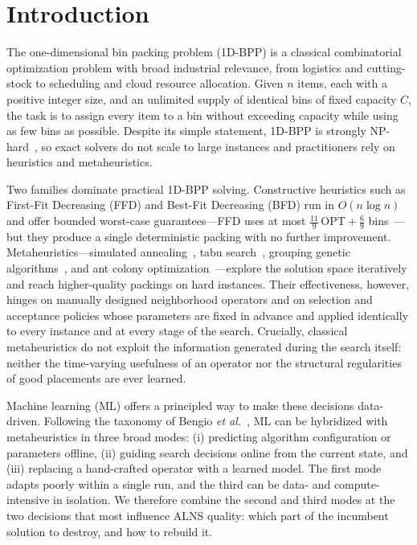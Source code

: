 \documentclass[conference]{IEEEtran}
\begin{document}
\section{Introduction}\label{sec:intro}

The one-dimensional bin packing problem (1D-BPP) is a classical combinatorial
optimization problem with broad industrial relevance, from logistics and
cutting-stock to scheduling and cloud resource allocation. Given $n$ items, each
with a positive integer size, and an unlimited supply of identical bins of fixed
capacity $C$, the task is to assign every item to a bin without exceeding capacity
while using as few bins as possible. Despite its simple statement, 1D-BPP is
strongly NP-hard~\cite{bGarey}, so exact solvers do not scale to large instances
and practitioners rely on heuristics and metaheuristics.

Two families dominate practical 1D-BPP solving. Constructive heuristics such as
First-Fit Decreasing (FFD) and Best-Fit Decreasing (BFD) run in $O(n\log n)$ and
offer bounded worst-case guarantees---FFD uses at most $\tfrac{11}{9}\,\mathrm{OPT}+\tfrac{6}{9}$
bins~\cite{bJohnson}---but they produce a single deterministic packing with no
further improvement. Metaheuristics---simulated annealing~\cite{bKirkpatrick},
tabu search~\cite{bGlover}, grouping genetic algorithms~\cite{bFalkenauer}, and
ant colony optimization~\cite{bDorigo}---explore the solution space iteratively
and reach higher-quality packings on hard instances. Their effectiveness,
however, hinges on manually designed neighborhood operators and on
selection and acceptance policies whose parameters are fixed in advance and
applied identically to every instance and at every stage of the search.
Crucially, classical metaheuristics do not exploit the information generated
during the search itself: neither the time-varying usefulness of an operator nor
the structural regularities of good placements are ever learned.

Machine learning (ML) offers a principled way to make these decisions
data-driven. Following the taxonomy of Bengio \textit{et al.}~\cite{bBengio}, ML
can be hybridized with metaheuristics in three broad modes: (i) predicting
algorithm configuration or parameters offline, (ii) guiding search decisions
online from the current state, and (iii) replacing a hand-crafted operator with a
learned model. The first mode adapts poorly within a single run, and the third
can be data- and compute-intensive in isolation. We therefore combine the second
and third modes at the two decisions that most influence ALNS quality: which part
of the incumbent solution to destroy, and how to rebuild it.
\end{document}
